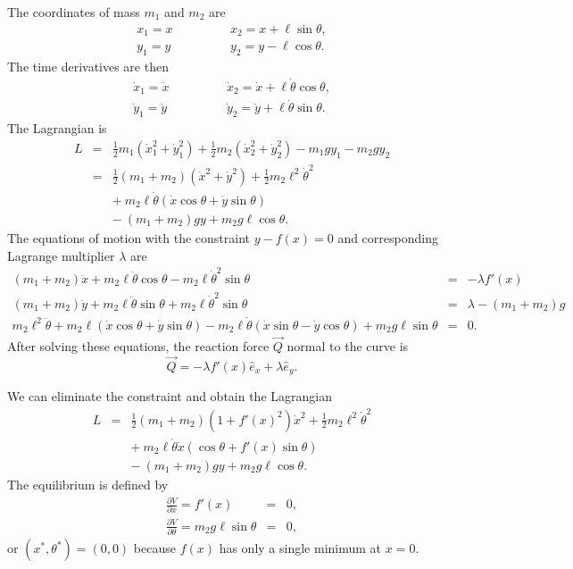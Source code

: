 \documentclass[letterpaper,11pt]{article}
\begin{document}
The coordinates of mass $m_1$ and $m_2$ are
\begin{eqnarray*}
 x_1 = x \quad & \quad & \quad x_2 = x + \ell \sin\theta, \\
 y_1 = y \quad & \quad & \quad y_2 = y - \ell \cos\theta.
\end{eqnarray*}
The time derivatives are then
\begin{eqnarray*}
 \dot{x}_1 = \dot{x} \quad & \quad & \quad \dot{x}_2 = \dot{x} + \ell \dot{\theta} \cos\theta, \\
 \dot{y}_1 = \dot{y} \quad & \quad & \quad \dot{y}_2 = \dot{y} + \ell \dot{\theta} \sin\theta.
\end{eqnarray*}
The Lagrangian is
\begin{eqnarray*}
 L & = & \frac{1}{2} m_1 (\dot{x}_1^2 + \dot{y}_1^2) + \frac{1}{2} m_2 (\dot{x}_2^2 + \dot{y}_2^2) - m_1 g y_1 - m_2 g y_2 \\
   & = & \frac{1}{2} (m_1 + m_2) (\dot{x}^2 + \dot{y}^2) + \frac{1}{2} m_2 \ell^2 \dot{\theta}^2 \\
   &   & + ~ m_2 \ell \dot{\theta} (\dot{x}\cos\theta + \dot{y}\sin\theta) \\
   &   & - ~ (m_1 + m_2) g y + m_2 g \ell \cos\theta.
\end{eqnarray*}
The equations of motion with the constraint $y - f(x) = 0$ and corresponding Lagrange multiplier $\lambda$ are
\begin{eqnarray*}
 (m_1 + m_2) \ddot{x} + m_2 \ell \ddot{\theta} \cos\theta - m_2 \ell \dot{\theta}^2 \sin\theta & = & - \lambda f'(x) \\
 (m_1 + m_2) \ddot{y} + m_2 \ell \ddot{\theta} \sin\theta + m_2 \ell \dot{\theta}^2 \sin\theta & = & \lambda - (m_1 + m_2) g \\
 m_2 \ell^2 \ddot{\theta} + m_2 \ell (\dot{x} \cos\theta + \dot{y} \sin\theta) - m_2 \ell \dot{\theta} (\dot{x} \sin\theta - \dot{y} \cos\theta) + m_2 g \ell \sin\theta & = & 0.
\end{eqnarray*}
After solving these equations, the reaction force $\vec{Q}$ normal to the curve is
\begin{equation*}
 \vec{Q} = - \lambda f'(x) \hat{e}_x + \lambda \hat{e}_y.
\end{equation*}

We can eliminate the constraint and obtain the Lagrangian
\begin{eqnarray*}
 L & = & \frac{1}{2} (m_1 + m_2) (1 + f'(x)^2) \dot{x}^2 + \frac{1}{2} m_2 \ell^2 \dot{\theta}^2 \\
   &   & + ~ m_2 \ell \dot{\theta} \dot{x} (\cos\theta + f'(x) \sin\theta) \\
   &   & - ~ (m_1 + m_2) g y + m_2 g \ell \cos\theta.
\end{eqnarray*}
The equilibrium is defined by
\begin{eqnarray*}
 \frac{\partial V}{\partial x} = f'(x) & = & 0, \\
 \frac{\partial V}{\partial \theta} = m_2 g \ell \sin\theta & = & 0,
\end{eqnarray*}
or $(x^*,\theta^*) = (0,0)$ because $f(x)$ has only a single minimum at $x = 0$.
\end{document}
